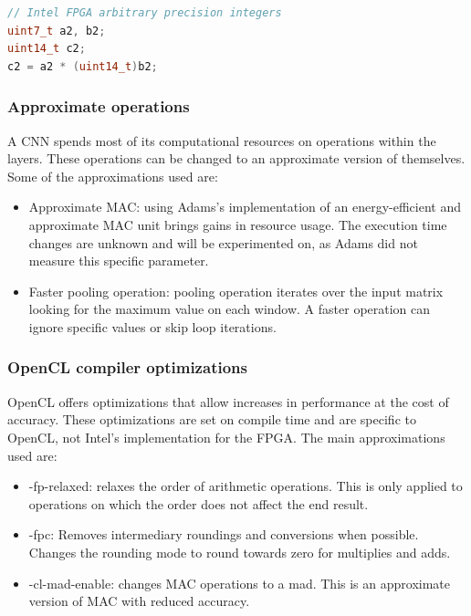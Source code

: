 \begin{enumerate}
\begin{lstlisting}[language=C++, caption=Arbitrary precision integers, yielding
a 14 bit result, label=code:arbitrary]
// Intel FPGA arbitrary precision integers
uint7_t a2, b2;
uint14_t c2;
c2 = a2 * (uint14_t)b2;
\end{lstlisting}

\subsubsection{Approximate operations}

A CNN spends most of its computational resources on operations within the layers. These operations
can be changed to an approximate version of themselves. Some of the approximations used are:

\begin{itemize}
    \item Approximate MAC: using Adams's \cite{adams2019energy} 
    implementation of an energy-efficient
    and approximate MAC unit brings gains in resource usage. 
    The execution time changes
    are unknown and will be experimented on, as 
    Adams did not measure this specific parameter.
    \item Faster pooling operation: pooling operation iterates over the input matrix
    looking for the maximum value on each window. A faster operation can ignore specific
    values or skip loop iterations.
\end{itemize}

\subsubsection{OpenCL compiler optimizations}

OpenCL offers optimizations that allow increases in performance at the cost of accuracy.
These optimizations are set on compile time and are specific to OpenCL, not Intel's implementation
for the FPGA. The main approximations used are:

\begin{itemize}
    \item -fp-relaxed: relaxes the order of arithmetic operations. This is only applied 
    to operations on which the order does not affect the end result.
    \item -fpc: Removes intermediary roundings and conversions when possible. 
    Changes the rounding mode to round towards zero for 
    multiplies and adds.
    \item -cl-mad-enable: changes MAC operations to a mad. This is an approximate version of
    MAC with reduced accuracy.
\end{itemize}


\end{enumerate}
